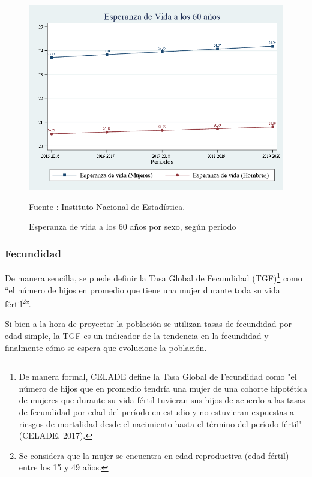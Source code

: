 \begin{figure}[H]
\begin{center}
                    \caption{Esperanza de vida a los 60 años por sexo, según periodo}
                    \includegraphics[scale=0.45]{INE_indic_ex_periodo_60.png}
                    \item \footnotesize Fuente : Instituto Nacional de Estadística.
                    \end{center}
\end{figure}

\subsubsection{Fecundidad}

De manera sencilla, se puede definir la Tasa Global de Fecundidad
(TGF)\footnote{ De manera formal, CELADE define la Tasa Global de Fecundidad como "el número de hijos que en promedio tendría una mujer de una cohorte hipotética de mujeres que durante su
 vida fértil tuvieran sus hijos de acuerdo a las tasas de fecundidad por edad del período en estudio y no estuvieran expuestas a riesgos de mortalidad desde el nacimiento hasta el término del período fértil" (CELADE, 2017).}
como ``el número de hijos en promedio que tiene una mujer durante toda
su vida
fértil\footnote{ Se considera que la mujer se encuentra en edad reproductiva (edad fértil) entre los 15 y 49 años.}''.

Si bien a la hora de proyectar la población se utilizan tasas de
fecundidad por edad simple, la TGF es un indicador de la tendencia en la
fecundidad y finalmente cómo se espera que evolucione la población.

